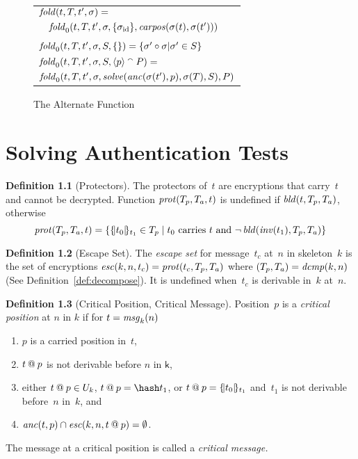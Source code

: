 \documentclass[12pt]{report}
\theoremstyle{definition}
\newtheorem{defn}{Definition}[chapter]
\newcommand{\msg}{\fn{msg}}
\newcommand{\skel}{\mathsf{k}}
\begin{document}
\begin{figure}
\begin{center}
\begin{tabular}{l}
$\operatorname{\mathit{fold}}(t,T,t',\sigma)={}$\\
$\quad\operatorname{\mathit{fold}}_0(t,T,t',\sigma,\{\sigma_{\mathrm{id}}\},\operatorname{\mathit{carpos}}(\sigma(t), \sigma(t')))$\\
\\
$\operatorname{\mathit{fold}}_0(t,T,t',\sigma,S,\{\})=\{\sigma' \circ \sigma | \sigma' \in S\}$\\
$\operatorname{\mathit{fold}}_0(t,T,t',\sigma,S,\langle p\rangle \mathbin{{}^\smallfrown} P)={}$\\
\quad
$\operatorname{\mathit{fold}}_0(t,T,t',\sigma,\operatorname{\mathit{solve}}(\operatorname{\mathit{anc}}(\sigma(t'),p),\sigma(T),S),P)$\\
\end{tabular}
\end{center}
\caption{The Alternate  Function}\label{fig:fold}
\end{figure}

\chapter{Solving Authentication Tests}\label{chp:auth tests}

\begin{defn}[Protectors]
The protectors of~$t$ are encryptions that carry~$t$
and cannot be decrypted.  Function $\operatorname{\mathit{prot}}(T_p,T_a,t)$ is undefined
if $\operatorname{\mathit{bld}}(t,T_p,T_a)$, otherwise
\[\operatorname{\mathit{prot}}(T_p,T_a,t)=\{\{\!|t_0|\!\}_{t_1}\in T_p\mid
\mbox{$t_0$ carries $t$ and }\lnot\operatorname{\mathit{bld}}(\operatorname{\mathit{inv}}(t_1),T_p,T_a)\}\]
\end{defn}

\begin{defn}[Escape Set]
The \emph{escape set} for message~$t_c$ at~$n$ in
skeleton~$k$ is the set of encryptions
$\operatorname{\mathit{esc}}(k,n,t_c)=\operatorname{\mathit{prot}}(t_c,T_p,T_a)$ where
$(T_p,T_a)=\operatorname{\mathit{dcmp}}(k,n)$ (See Definition~\ref{def:decompose}).  It
is undefined when~$t_c$ is derivable in~$k$ at~$n$.
\end{defn}

\begin{defn}[Critical Position, Critical Message]\label{def:critical position}
  Position~$p$ is a \emph{critical position}
  at $n$ in $k$ if for $t=\msg_k(n)$
\begin{enumerate}
\item $p$ is a carried position in~$t$,
\item $t\mathbin{@} p$ is not derivable before $n$ in $\skel$,
\item either $t\mathbin{@} p\in U_k$, $t\termat p=\hash t_1$, or $t\mathbin{@}
  p=\{\!|t_0|\!\}_{t_1}$ and~$t_1$ is not derivable before~$n$ in~$k$, and
  \label{item:nonce or encryption}
\item $\operatorname{\mathit{anc}}(t,p)\cap \operatorname{\mathit{esc}}(k,n,t\mathbin{@} p)=\emptyset$.
\end{enumerate}
The message at a critical position is called a \emph{critical message.}
\end{defn}
\end{document}
